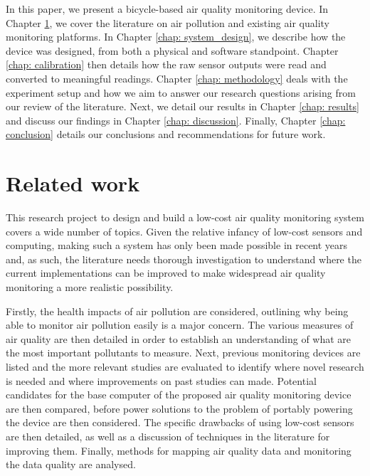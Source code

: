 \documentclass[11pt]{report}
\begin{document}
In this paper, we present a bicycle-based air quality monitoring device. In Chapter \ref{chap: related_work}, we cover the literature on air pollution and existing air quality monitoring platforms. In Chapter \ref{chap: system_design}, we describe how the device was designed, from both a physical and software standpoint. Chapter \ref{chap: calibration} then details how the raw sensor outputs were read and converted to meaningful readings. Chapter \ref{chap: methodology} deals with the experiment setup and how we aim to answer our research questions arising from our review of the literature. Next, we detail our results in Chapter \ref{chap: results} and discuss our findings in Chapter \ref{chap: discussion}. Finally, Chapter \ref{chap: conclusion} details our conclusions and recommendations for future work.



\chapter{Related work} \label{chap: related_work}

This research project to design and build a low-cost air quality monitoring system covers a wide number of topics. Given the relative infancy of low-cost sensors and computing, making such a system has only been made possible in recent years and, as such, the literature needs thorough investigation to understand where the current implementations can be improved to make widespread air quality monitoring a more realistic possibility. 

Firstly, the health impacts of air pollution are considered, outlining why being able to monitor air pollution easily is a major concern. The various measures of air quality are then detailed in order to establish an understanding of what are the most important pollutants to measure. Next, previous monitoring devices are listed and the more relevant studies are evaluated to identify where novel research is needed and where improvements on past studies can made. Potential candidates for the base computer of the proposed air quality monitoring device are then compared, before power solutions to the problem of portably powering the device are then considered. The specific drawbacks of using low-cost sensors are then detailed, as well as a discussion of techniques in the literature for improving them. Finally, methods for mapping air quality data and monitoring the data quality are analysed. 
\end{document}
